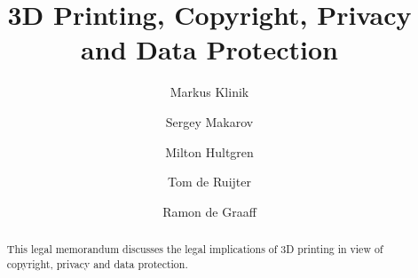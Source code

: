 \documentclass[a4paper]{article}
\begin{document}
\title{3D Printing, Copyright, Privacy and Data Protection}
\author{Markus Klinik
   \and Sergey Makarov
   \and Milton Hultgren
   \and Tom de Ruijter
   \and Ramon de Graaff}
\maketitle

\begin{abstract}

This legal memorandum discusses the legal implications of 3D printing in view of
copyright, privacy and data protection.

\end{abstract}





\end{document}

